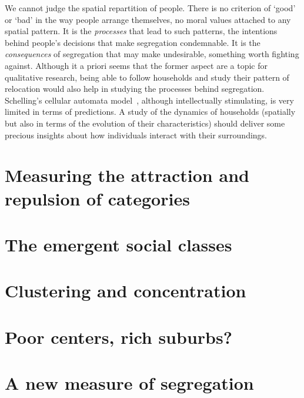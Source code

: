We cannot judge the spatial repartition of people. There is no criterion of
`good' or `bad' in the way people arrange themselves, no moral values attached 
to any spatial pattern. It is the \emph{processes} that lead to such
patterns, the intentions behind people's decisions that make segregation
condemnable. It is the \emph{consequences} of segregation that may make
undesirable, something worth fighting against. Although it a priori seems that
the former aspect are a topic for qualitative research, being able to follow
households and study their pattern of relocation would also help in studying
the processes behind segregation. Schelling's cellular automata
model~\cite{Schelling:1971}, although intellectually stimulating, is very
limited in terms of predictions. A study of the dynamics of households
(spatially but also in terms of the evolution of their characteristics) should
deliver some precious insights about how individuals interact with their
surroundings.



\section{Measuring the attraction and repulsion of categories}
\label{sec:measuring_the_attraction_and_repulsion_of_categories}

\section{The emergent social classes}
\label{sec:the_emergent_social_classes}

\section{Clustering and concentration}
\label{sec:clustering_and_concentration}

\section{Poor centers, rich suburbs?}
\label{sec:poor_centers_rich_suburbs_}

\section{A new measure of segregation}
\label{sec:a_new_measure_of_segregation}
